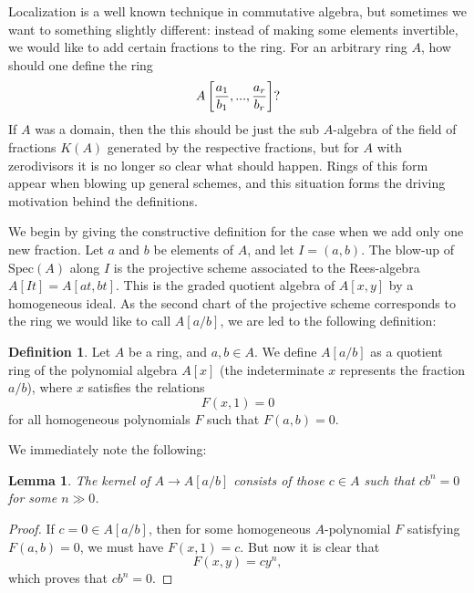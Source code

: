 \documentclass[12pt,a4paper,leqno]{article}
\newcommand{\spec}{\mathrm{Spec}}
\theoremstyle{plain}
\newtheorem{lem}[theo]{Lemma}
\theoremstyle{definition}
\newtheorem{defn}[theo]{Definition}
\theoremstyle{remark}
\begin{document}
Localization is a well known technique in commutative algebra, but sometimes we want to something slightly different: instead of making some elements invertible, we would like to add certain fractions to the ring. For an arbitrary ring $A$, how should one define the ring
\begin{equation*}
A \left[ {a_1 \over b_1} , ... , {a_r \over b_r} \right]?
\end{equation*}
If $A$ was a domain, then the this should be just the sub $A$-algebra of the field of fractions $K(A)$ generated by the respective fractions, but for $A$ with zerodivisors it is no longer so clear what should happen. Rings of this form appear when blowing up general schemes, and this situation forms the driving motivation behind the definitions.   

We begin by giving the constructive definition for the case when we add only one new fraction. Let $a$ and $b$ be elements of $A$, and let $I = (a,b)$. The blow-up of $\spec (A)$ along $I$ is the projective scheme associated to the Rees-algebra $A[It] = A[at, bt]$. This is the graded quotient algebra of $A[x,y]$ by a homogeneous ideal. As the second chart of the projective scheme corresponds to the ring we would like to call $A[a/b]$, we are led to the following definition:   

\begin{defn}
Let $A$ be a ring, and $a,b \in A$. We define $A[a/b]$ as a quotient ring of the polynomial algebra $A[x]$ (the indeterminate $x$ represents the fraction $a/b$), where $x$ satisfies the relations
\begin{equation*}
F(x,1) = 0
\end{equation*}
for all homogeneous polynomials $F$ such that $F(a,b) = 0$.
\end{defn}

We immediately note the following:

\begin{lem}\label{TheKernel}
The kernel of $A \to A[a/b]$ consists of those $c \in A$ such that $cb^n = 0$ for some $n \gg 0$.
\end{lem}
\begin{proof}
If $c = 0 \in A[a/b]$, then for some homogeneous $A$-polynomial $F$ satisfying $F(a,b) = 0$, we must have $F(x,1) = c$. But now it is clear that
\begin{equation*}
F(x,y) = c y^n,
\end{equation*}
which proves that $c b^n = 0$.
\end{proof}
\end{document}
